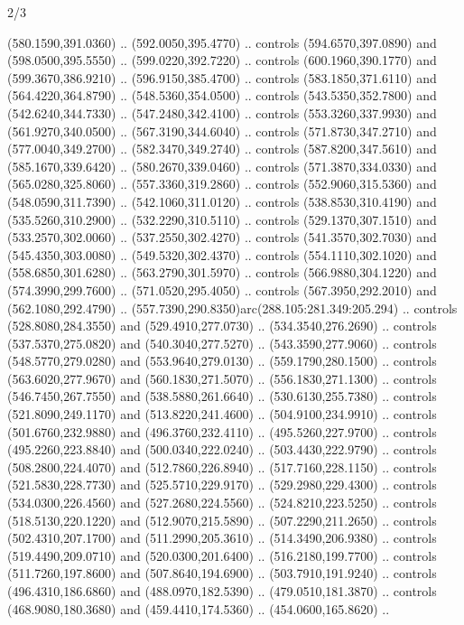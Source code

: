 \begin{flagdescription}{2/3}
\begin{scope}[xshift=0.5\flaglength]
\begin{scope}[scale=0.0021\flagwidth,yshift=167.8mm,xshift=-125.3mm]
\begin{scope}[y=-0.8pt, x=0.8pt, inner sep=0pt, outer sep=0pt]
  (580.1590,391.0360) .. (592.0050,395.4770) .. controls (594.6570,397.0890) and
  (598.0500,395.5550) .. (599.0220,392.7220) .. controls (600.1960,390.1770) and
  (599.3670,386.9210) .. (596.9150,385.4700) .. controls (583.1850,371.6110) and
  (564.4220,364.8790) .. (548.5360,354.0500) .. controls (543.5350,352.7800) and
  (542.6240,344.7330) .. (547.2480,342.4100) .. controls (553.3260,337.9930) and
  (561.9270,340.0500) .. (567.3190,344.6040) .. controls (571.8730,347.2710) and
  (577.0040,349.2700) .. (582.3470,349.2740) .. controls (587.8200,347.5610) and
  (585.1670,339.6420) .. (580.2670,339.0460) .. controls (571.3870,334.0330) and
  (565.0280,325.8060) .. (557.3360,319.2860) .. controls (552.9060,315.5360) and
  (548.0590,311.7390) .. (542.1060,311.0120) .. controls (538.8530,310.4190) and
  (535.5260,310.2900) .. (532.2290,310.5110) .. controls (529.1370,307.1510) and
  (533.2570,302.0060) .. (537.2550,302.4270) .. controls (541.3570,302.7030) and
  (545.4350,303.0080) .. (549.5320,302.4370) .. controls (554.1110,302.1020) and
  (558.6850,301.6280) .. (563.2790,301.5970) .. controls (566.9880,304.1220) and
  (574.3990,299.7600) .. (571.0520,295.4050) .. controls (567.3950,292.2010) and
  (562.1080,292.4790) .. (557.7390,290.8350)arc(288.105:281.349:205.294) ..
  controls (528.8080,284.3550) and (529.4910,277.0730) .. (534.3540,276.2690) ..
  controls (537.5370,275.0820) and (540.3040,277.5270) .. (543.3590,277.9060) ..
  controls (548.5770,279.0280) and (553.9640,279.0130) .. (559.1790,280.1500) ..
  controls (563.6020,277.9670) and (560.1830,271.5070) .. (556.1830,271.1300) ..
  controls (546.7450,267.7550) and (538.5880,261.6640) .. (530.6130,255.7380) ..
  controls (521.8090,249.1170) and (513.8220,241.4600) .. (504.9100,234.9910) ..
  controls (501.6760,232.9880) and (496.3760,232.4110) .. (495.5260,227.9700) ..
  controls (495.2260,223.8840) and (500.0340,222.0240) .. (503.4430,222.9790) ..
  controls (508.2800,224.4070) and (512.7860,226.8940) .. (517.7160,228.1150) ..
  controls (521.5830,228.7730) and (525.5710,229.9170) .. (529.2980,229.4300) ..
  controls (534.0300,226.4560) and (527.2680,224.5560) .. (524.8210,223.5250) ..
  controls (518.5130,220.1220) and (512.9070,215.5890) .. (507.2290,211.2650) ..
  controls (502.4310,207.1700) and (511.2990,205.3610) .. (514.3490,206.9380) ..
  controls (519.4490,209.0710) and (520.0300,201.6400) .. (516.2180,199.7700) ..
  controls (511.7260,197.8600) and (507.8640,194.6900) .. (503.7910,191.9240) ..
  controls (496.4310,186.6860) and (488.0970,182.5390) .. (479.0510,181.3870) ..
  controls (468.9080,180.3680) and (459.4410,174.5360) .. (454.0600,165.8620) ..

\end{scope}
\end{scope}
\end{scope}
\end{flagdescription}
